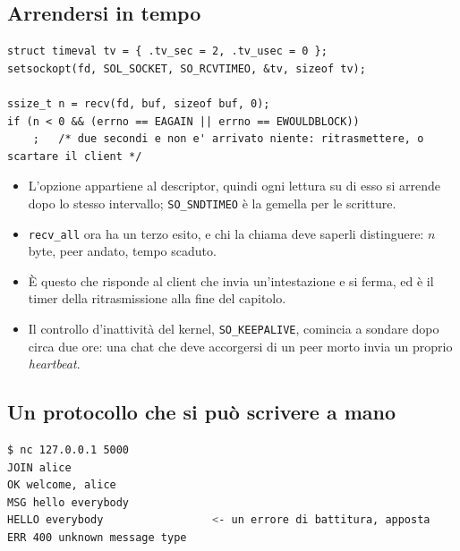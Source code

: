 \subsection{Arrendersi in tempo}

\begin{lstlisting}[language={[POSIX]C}, style=wnumbers, title={Un timeout di lettura}]
struct timeval tv = { .tv_sec = 2, .tv_usec = 0 };
setsockopt(fd, SOL_SOCKET, SO_RCVTIMEO, &tv, sizeof tv);

ssize_t n = recv(fd, buf, sizeof buf, 0);
if (n < 0 && (errno == EAGAIN || errno == EWOULDBLOCK))
    ;   /* due secondi e non e' arrivato niente: ritrasmettere, o scartare il client */
\end{lstlisting}

\begin{itemize}
    \item L'opzione appartiene al descriptor, quindi ogni lettura su di esso si arrende dopo lo stesso intervallo;
          \texttt{SO\_SNDTIMEO} è la gemella per le scritture.
    \item \texttt{recv\_all} ora ha un terzo esito, e chi la chiama deve saperli distinguere: $n$ byte, peer andato,
          tempo scaduto.
    \item È questo che risponde al client che invia un'intestazione e si ferma, ed è il timer della ritrasmissione alla
          fine del capitolo.
    \item Il controllo d'inattività del kernel, \texttt{SO\_KEEPALIVE}, comincia a sondare dopo circa due ore: una chat che
          deve accorgersi di un peer morto invia un proprio \emph{heartbeat}.
\end{itemize}

\subsection{Un protocollo che si può scrivere a mano}

\begin{lstlisting}[language=bash, title={La versione a testo dello stesso protocollo, con nc}]
$ nc 127.0.0.1 5000
JOIN alice
OK welcome, alice
MSG hello everybody
HELLO everybody                 <- un errore di battitura, apposta
ERR 400 unknown message type
\end{lstlisting}

